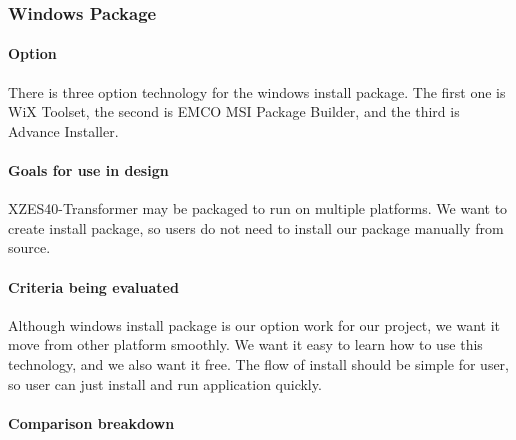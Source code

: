 \subsubsection{Windows Package}

\paragraph{Option}

There is three option technology for the windows install package.
The first one is WiX Toolset, the second is EMCO MSI Package Builder, and the third is Advance Installer.

\paragraph{Goals for use in design}

XZES40-Transformer may be packaged to run on multiple platforms.
We want to create install package, so users do not need to install our package manually from source.

\paragraph{Criteria being evaluated}

Although windows install package is our option work for our project, we want it move from other platform smoothly.
We want it easy to learn how to use this technology, and we also want it free.
The flow of install should be simple for user, so user can just install and run application quickly.

\paragraph{Comparison breakdown}


